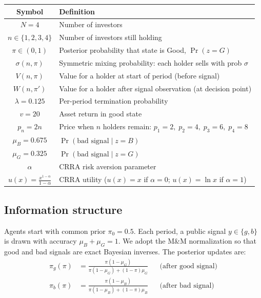 \documentclass[11pt]{article}
\begin{document}
\begin{table}[h]
\centering
\begin{tabular}{cl}
\toprule
Symbol & Definition \\
\midrule
$N = 4$ & Number of investors \\
$n \in \{1,2,3,4\}$ & Number of investors still holding \\
$\pi \in (0,1)$ & Posterior probability that state is Good, $\Pr(z = G)$ \\
$\sigma(n,\pi)$ & Symmetric mixing probability: each holder sells with prob $\sigma$ \\
$V(n,\pi)$ & Value for a holder at start of period (before signal) \\
$W(n,\pi')$ & Value for a holder after signal observation (at decision point) \\
$\lambda = 0.125$ & Per-period termination probability \\
$v = 20$ & Asset return in good state \\
$p_n = 2n$ & Price when $n$ holders remain: $p_1 = 2,\; p_2 = 4,\; p_3 = 6,\; p_4 = 8$ \\
$\mu_B = 0.675$ & $\Pr(\text{bad signal} \mid z = B)$ \\
$\mu_G = 0.325$ & $\Pr(\text{bad signal} \mid z = G)$ \\
$\alpha$ & CRRA risk aversion parameter \\
$u(x) = \frac{x^{1-\alpha}}{1-\alpha}$ & CRRA utility ($u(x) = x$ if $\alpha = 0$; $u(x) = \ln x$ if $\alpha = 1$) \\
\bottomrule
\end{tabular}
\end{table}

\subsection{Information structure}

Agents start with common prior $\pi_0 = 0.5$. Each period, a public signal
$y \in \{g, b\}$ is drawn with accuracy $\mu_B + \mu_G = 1$. We adopt the
M\&M normalization so that good and bad signals are exact Bayesian
inverses. The posterior updates are:
%
\begin{align}
    \pi_g(\pi) &= \frac{\pi(1-\mu_G)}{\pi(1-\mu_G) + (1-\pi)\mu_G}
    & &\text{(after good signal)} \label{eq:pi_good} \\[4pt]
    \pi_b(\pi) &= \frac{\pi(1-\mu_B)}{\pi(1-\mu_B) + (1-\pi)\mu_B}
    & &\text{(after bad signal)} \label{eq:pi_bad}
\end{align}
\end{document}
